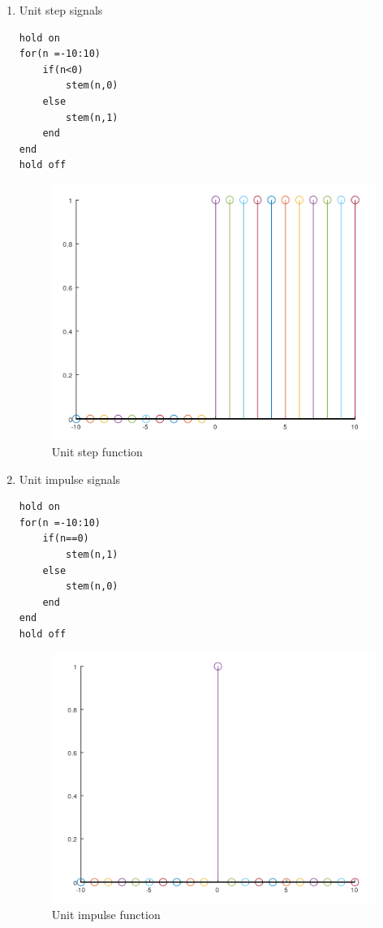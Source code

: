 \documentclass[12pt]{article}
\begin{document}
\begin{enumerate}
    \item Unit step signals
    \begin{Verbatim}[frame = single]
hold on
for(n =-10:10)
    if(n<0)
        stem(n,0)
    else
        stem(n,1)
    end
end
hold off
                \end{Verbatim}
                \begin{figure}[h!]
                    \centering
                    \includegraphics[scale =0.7]{labss/Lab2_4a.PNG}
                    \caption{Unit step function}
                \end{figure}
                \pagebreak
    \item Unit impulse signals
    \begin{Verbatim}[frame = single]
hold on
for(n =-10:10)
    if(n==0)
        stem(n,1)
    else
        stem(n,0)
    end
end
hold off
                        \end{Verbatim}
                        \begin{figure}[h!]
                            \centering
                            \includegraphics[scale =0.7]{labss/Lab2_5a.PNG}
                            \caption{Unit impulse function}
                        \end{figure}
\end{enumerate}
\end{document}
